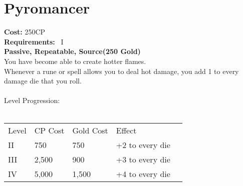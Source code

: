 \section{Pyromancer}\label{perk:pyromancer}
\textbf{Cost:} 250CP\\
\textbf{Requirements:}~ I\\
\textbf{Passive, Repeatable, Source(250 Gold)}\\
You have become able to create hotter flames.\\
Whenever a rune or spell allows you to deal hot damage, you add 1 to every damage die that you roll.\\
\\
Level Progression:\\
\\
\begin{tabular}{l | l | l | l | l}
    Level & CP Cost & Gold Cost &  Effect\\
    II & 750 & 750 & +2 to every die\\
    III & 2,500 & 900 & +3 to every die\\
    IV & 5,000 & 1,500 & +4 to every die\\
\end{tabular}